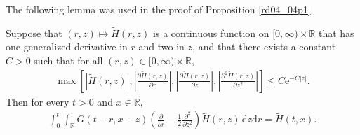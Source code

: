 \documentclass[12pt,a4paper]{article}
\newcommand{\R}{{\mathbb{R}}}
\renewcommand{\d}{\mathrm{d}}
\newcommand{\<}{\langle}
\renewcommand{\>}{\rangle}
\newcommand{\e}{\mathrm{e}}
\begin{document}
  
  
  
 
 The following lemma was used in the proof of Proposition \ref{rd04_04p1}.
 
\begin{lemma}\label{lem:heat}
Suppose that $(r, z) \mapsto \tilde{H}(r, z)$ is a continuous function on $[0, \infty) \times \R$ that has one generalized derivative in $r$ and two  in $z$, and that
there exists a constant $C>0$ such that for all $(r, z)\in [0, \infty)\times\R$,
\begin{align*}
  \max\left[ |\tilde{H}(r, z)|, \left|\frac{\partial \tilde{H}(r, z)}{\partial r}\right|, \left|\frac{\partial \tilde{H}(r, z)}{\partial z}\right|, 
\left|\frac{\partial^2 \tilde{H}(r, z)}{\partial z^2}\right| \right] \leq C\e^{-C|z|}. 
\end{align*}
 Then for every $t>0$ and $x\in \R$, 
\begin{align*}
\int_0^t\int_\R G(t-r, x-z)\left(\frac{\partial }{\partial r}-\frac12\frac{\partial^2}{\partial z^2}\right)\tilde{H}(r,z)\, \d z\d r= \tilde{H}(t,x).
\end{align*}
\end{lemma}
\end{document}
